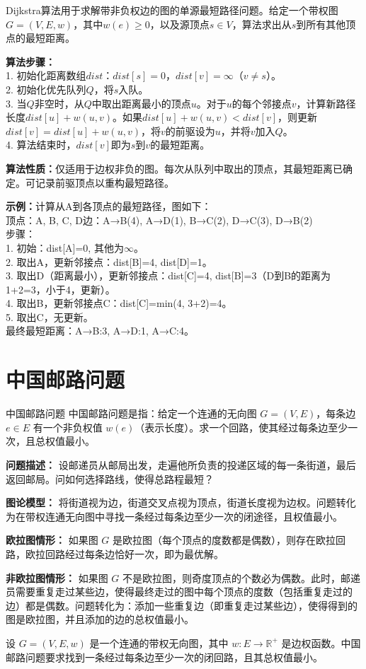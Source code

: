 \documentclass[lang=cn,11pt]{elegantbook}
\begin{document}
Dijkstra算法用于求解带非负权边的图的单源最短路径问题。给定一个带权图$G=(V,E,w)$，其中$w(e)\geqslant 0$，以及源顶点$s\in V$，算法求出从$s$到所有其他顶点的最短距离。

\textbf{算法步骤：}\\
1. 初始化距离数组$dist$：$dist[s]=0$，$dist[v]=\infty$（$v\neq s$）。\\
2. 初始化优先队列$Q$，将$s$入队。\\
3. 当$Q$非空时，从$Q$中取出距离最小的顶点$u$。对于$u$的每个邻接点$v$，计算新路径长度$dist[u]+w(u,v)$。如果$dist[u]+w(u,v)<dist[v]$，则更新$dist[v]=dist[u]+w(u,v)$，将$v$的前驱设为$u$，并将$v$加入$Q$。\\
4. 算法结束时，$dist[v]$即为$s$到$v$的最短距离。

\textbf{算法性质：}仅适用于边权非负的图。每次从队列中取出的顶点，其最短距离已确定。可记录前驱顶点以重构最短路径。

\textbf{示例：}计算从A到各顶点的最短路径，图如下：\\
顶点：A, B, C, D\quad 边：A→B(4), A→D(1), B→C(2), D→C(3), D→B(2)\\
步骤：\\
1. 初始：dist[A]=0, 其他为$\infty$。\\
2. 取出A，更新邻接点：dist[B]=4, dist[D]=1。
\\
3. 取出D（距离最小），更新邻接点：dist[C]=4, dist[B]=3（D到B的距离为1+2=3，小于4，更新）。\\
4. 取出B，更新邻接点C：dist[C]=min(4, 3+2)=4。\\
5. 取出C，无更新。\\
最终最短距离：A→B:3, A→D:1, A→C:4。

\section{中国邮路问题}
\begin{definition}{中国邮路问题}
    中国邮路问题是指：给定一个连通的无向图 $G=(V,E)$，每条边 $e\in E$ 有一个非负权值 $w(e)$（表示长度）。求一个回路，使其经过每条边至少一次，且总权值最小。

    \textbf{问题描述：}
    设邮递员从邮局出发，走遍他所负责的投递区域的每一条街道，最后返回邮局。问如何选择路线，使得总路程最短？

    \textbf{图论模型：}
    将街道视为边，街道交叉点视为顶点，街道长度视为边权。问题转化为在带权连通无向图中寻找一条经过每条边至少一次的闭途径，且权值最小。

    \textbf{欧拉图情形：}
    如果图 $G$ 是欧拉图（每个顶点的度数都是偶数），则存在欧拉回路，欧拉回路经过每条边恰好一次，即为最优解。

    \textbf{非欧拉图情形：}
    如果图 $G$ 不是欧拉图，则奇度顶点的个数必为偶数。此时，邮递员需要重复走过某些边，使得最终走过的图中每个顶点的度数（包括重复走过的边）都是偶数。问题转化为：添加一些重复边（即重复走过某些边），使得得到的图是欧拉图，并且添加的边的总权值最小。
\end{definition}
设 $G=(V,E,w)$ 是一个连通的带权无向图，其中 $w: E \to \mathbb{R}^+$ 是边权函数。中国邮路问题要求找到一条经过每条边至少一次的闭回路，且其总权值最小。
\end{document}
